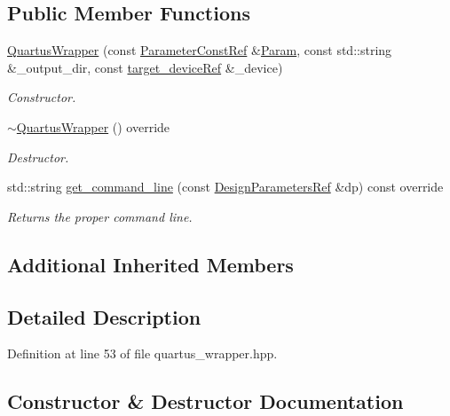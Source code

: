 \subsection*{Public Member Functions}
\begin{DoxyCompactItemize}
\item 
\hyperlink{classQuartusWrapper_a00e71f3b3eea518b01b07e12827095ca}{Quartus\+Wrapper} (const \hyperlink{Parameter_8hpp_a37841774a6fcb479b597fdf8955eb4ea}{Parameter\+Const\+Ref} \&\hyperlink{classSynthesisTool_a854ef102782ff4d069e1aa6d1a94d64e}{Param}, const std\+::string \&\+\_\+output\+\_\+dir, const \hyperlink{target__device_8hpp_acedb2b7a617e27e6354a8049fee44eda}{target\+\_\+device\+Ref} \&\+\_\+device)
\begin{DoxyCompactList}\small\item\em Constructor. \end{DoxyCompactList}\item 
\hyperlink{classQuartusWrapper_a9cff8b46a6974dd95dc9776f8428ebd7}{$\sim$\+Quartus\+Wrapper} () override
\begin{DoxyCompactList}\small\item\em Destructor. \end{DoxyCompactList}\item 
std\+::string \hyperlink{classQuartusWrapper_af543e4704f8dba7bf429b1c9ce58ac58}{get\+\_\+command\+\_\+line} (const \hyperlink{DesignParameters_8hpp_ae36bb1c4c9150d0eeecfe1f96f42d157}{Design\+Parameters\+Ref} \&dp) const override
\begin{DoxyCompactList}\small\item\em Returns the proper command line. \end{DoxyCompactList}\end{DoxyCompactItemize}
\subsection*{Additional Inherited Members}


\subsection{Detailed Description}


Definition at line 53 of file quartus\+\_\+wrapper.\+hpp.



\subsection{Constructor \& Destructor Documentation}
\mbox{\label{classQuartusWrapper_a00e71f3b3eea518b01b07e12827095ca}} 

